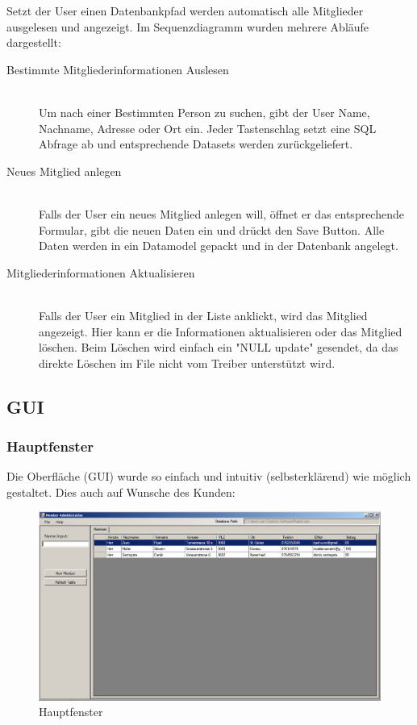 \documentclass{article}
\begin{document}
Setzt der User einen Datenbankpfad werden automatisch alle Mitglieder ausgelesen und angezeigt.
Im Sequenzdiagramm wurden mehrere Abläufe dargestellt: 
\begin{description}
	\item[Bestimmte Mitgliederinformationen Auslesen] \hfill \\ 
		Um nach einer Bestimmten Person zu suchen, gibt der User Name, Nachname, Adresse oder Ort ein. Jeder Tastenschlag setzt eine SQL Abfrage ab und entsprechende Datasets werden zurückgeliefert.
	
	\item[Neues Mitglied anlegen] \hfill \\  
		Falls der User ein neues Mitglied anlegen will, öffnet er das entsprechende Formular, gibt die neuen Daten ein und drückt den Save Button. Alle Daten werden in ein Datamodel gepackt und in der Datenbank angelegt.

	\item[Mitgliederinformationen Aktualisieren] \hfill \\ 
		 Falls der User ein Mitglied in der Liste anklickt, wird das Mitglied angezeigt. Hier kann er die Informationen aktualisieren oder das Mitglied löschen. Beim Löschen wird einfach ein "NULL update" gesendet, da das direkte Löschen im File nicht vom Treiber unterstützt wird.
\end{description}

\newpage


\subsection{GUI}
\subsubsection{Hauptfenster}
Die Oberfläche (GUI) wurde so einfach und intuitiv (selbsterklärend) wie möglich gestaltet. Dies auch auf Wunsche des Kunden:
\begin{figure}[h]
	\centering
	\includegraphics[width=1.0 \textwidth]{MainGUI}
	\caption{Hauptfenster}
\end{figure}
\end{document}
